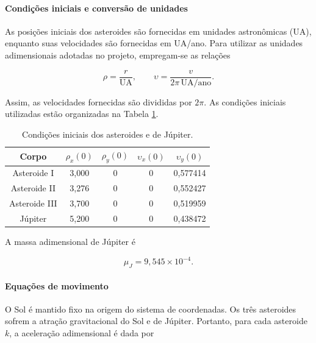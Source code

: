 \documentclass[12pt,a4paper]{article}
\begin{document}
\paragraph{Condições iniciais e conversão de unidades}

As posições iniciais dos asteroides são fornecidas em unidades astronômicas (UA), enquanto suas velocidades são fornecidas em UA/ano. Para utilizar as unidades adimensionais adotadas no projeto, empregam-se as relações

\begin{equation}
    \rho=\frac{r}{\mathrm{UA}},
    \qquad
    \upsilon=\frac{v}{2\pi\,\mathrm{UA}/\mathrm{ano}}.
\end{equation}

Assim, as velocidades fornecidas são divididas por $2\pi$. As condições iniciais utilizadas estão organizadas na Tabela \ref{tab:condicoes-asteroides}.

\begin{table}[htbp]
    \centering
    \caption{Condições iniciais dos asteroides e de Júpiter.}
    \label{tab:condicoes-asteroides}
    \begin{tabular}{c|c|c|c|c}
        \hline
        Corpo & $\rho_x(0)$ & $\rho_y(0)$ &
        $\upsilon_x(0)$ & $\upsilon_y(0)$ \\
        \hline
        Asteroide I & 3,000 & 0 & 0 & 0,577414 \\
        Asteroide II & 3,276 & 0 & 0 & 0,552427 \\
        Asteroide III & 3,700 & 0 & 0 & 0,519959 \\
        Júpiter & 5,200 & 0 & 0 & 0,438472 \\
        \hline
    \end{tabular}
\end{table}

A massa adimensional de Júpiter é

\begin{equation}
    \mu_J=9,545\times10^{-4}.
\end{equation}

\paragraph{Equações de movimento}

O Sol é mantido fixo na origem do sistema de coordenadas. Os três asteroides sofrem a atração gravitacional do Sol e de Júpiter. Portanto, para cada asteroide $k$, a aceleração adimensional é dada por
\end{document}
